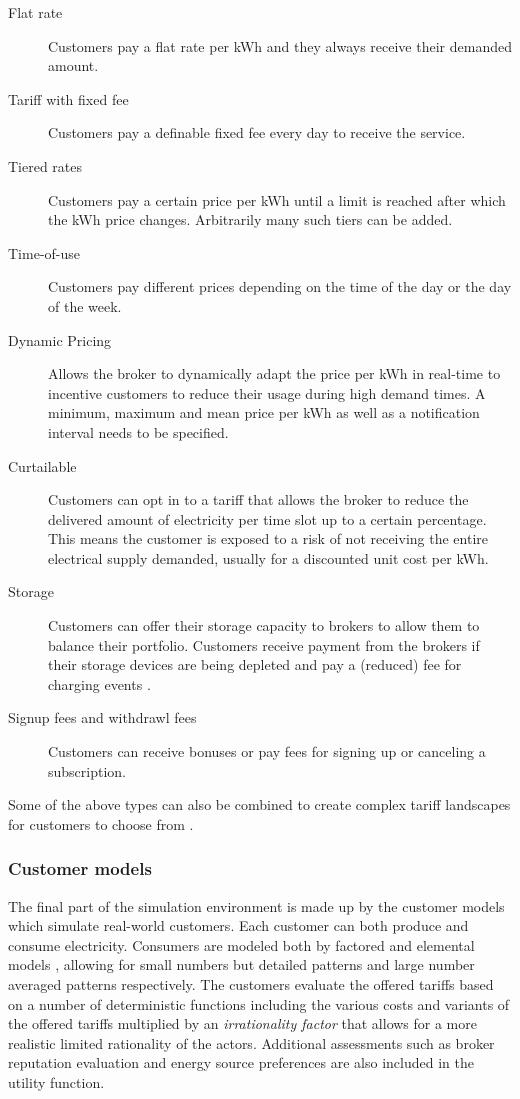 \begin{description}
    \item[Flat rate] Customers pay a flat rate per kWh and they always receive their demanded
        amount.
    \item[Tariff with fixed fee] Customers pay a definable fixed fee every day to receive the service.
    \item [Tiered rates] Customers pay a certain price per kWh until a limit is reached after which the kWh price
        changes.  Arbitrarily many such tiers can be added.  
    \item[Time-of-use] Customers pay different prices depending
        on the time of the day or the day of the week.  
    \item[Dynamic Pricing] Allows the broker to dynamically adapt the price per kWh in real-time to incentive customers
        to reduce their usage during high demand times. A minimum, maximum and mean price per kWh as well as a
        notification interval needs to be specified.
    \item[Curtailable] Customers can opt in to a tariff that allows the broker to reduce the delivered amount of
        electricity per time slot up to a certain percentage. This means the customer is exposed to a risk of not
        receiving the entire electrical supply demanded, usually for a discounted unit cost per kWh.  \item[Storage]
        Customers can offer their storage capacity to brokers to allow them to balance their portfolio. Customers
        receive payment from the brokers if their storage devices are being depleted and pay a (reduced) fee for charging
        events .
    \item[Signup fees and withdrawl fees] Customers can receive bonuses or pay fees
        for signing up or canceling a subscription.
\end{description}

\noindent Some of the above types can also be combined to create complex tariff landscapes for customers to choose from \citep[p.9]{ketter2018powertac}.

\subsubsection{Customer models}%

The final part of the simulation environment is made up by the customer models which simulate real-world customers.
Each customer can both produce and consume electricity. Consumers are modeled both by factored and elemental models
\citep[p.14]{ketter2018powertac}, allowing for small numbers but detailed patterns and large number averaged
patterns respectively. The customers evaluate the offered tariffs based on a number of deterministic functions
including the various costs and variants of the offered tariffs multiplied by an \emph{irrationality factor} that
allows for a more realistic limited rationality of the actors. Additional assessments such as broker reputation
evaluation and energy source preferences are also included in the utility function.

